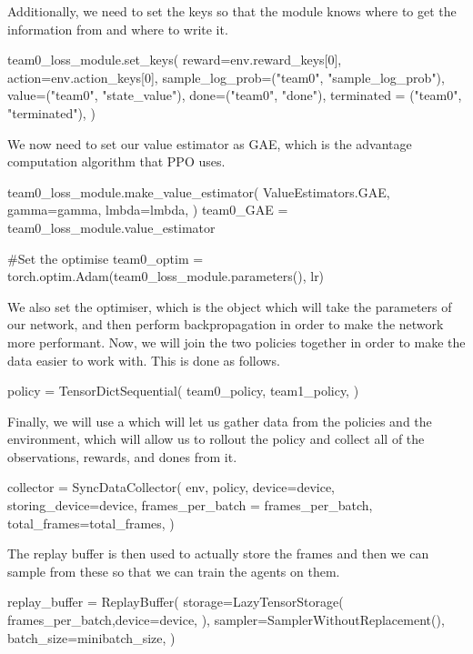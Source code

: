 Additionally, we need to set the keys so that the module knows where to get the information from and where to write it.

\begin{mpy}
team0_loss_module.set_keys(
    reward=env.reward_keys[0],
    action=env.action_keys[0],
    sample_log_prob=("team0", "sample_log_prob"),
    value=("team0", "state_value"),
    done=("team0", "done"),
    terminated = ("team0", "terminated"),
)
\end{mpy}

We now need to set our value estimator as GAE, which is the advantage computation algorithm that PPO uses.

\begin{mpy}
team0_loss_module.make_value_estimator(
    ValueEstimators.GAE, gamma=gamma, lmbda=lmbda,
)
team0_GAE = team0_loss_module.value_estimator

#Set the optimise
team0_optim = torch.optim.Adam(team0_loss_module.parameters(), lr)
\end{mpy}

We also set the optimiser, which is the object which will take the parameters of our network, and then perform backpropagation in order to make the network more performant. Now, we will join the two policies together in order to make the data easier to work with. This is done as follows.

\begin{mpy}
policy = TensorDictSequential(
   team0_policy,
   team1_policy,
)
\end{mpy}

Finally, we will use a  which will let us gather data from the policies and the environment, which will allow us to rollout the policy and collect all of the observations, rewards, and dones from it.

\begin{mpy}
collector = SyncDataCollector(
    env,
    policy,
    device=device,
    storing_device=device,
    frames_per_batch = frames_per_batch,
    total_frames=total_frames,
)
\end{mpy}

The replay buffer is then used to actually store the frames and then we can sample from these so that we can train the agents on them.

\begin{mpy}
replay_buffer = ReplayBuffer(
    storage=LazyTensorStorage(
        frames_per_batch,device=device,
    ),
    sampler=SamplerWithoutReplacement(),
    batch_size=minibatch_size,
)
\end{mpy}

